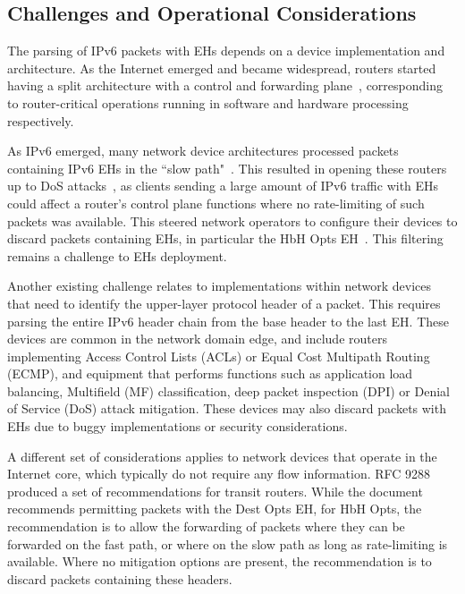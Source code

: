 \documentclass[conference]{IEEEtran}
\begin{document}
\subsection{Challenges and Operational Considerations}

The parsing of IPv6 packets with EHs depends on a device implementation and
architecture. As the Internet emerged and became widespread, routers started having a split architecture with a control and forwarding plane~\cite{RFC3654}, corresponding to router-critical operations running in software and hardware processing respectively.

As IPv6 emerged, many network device architectures processed packets containing IPv6 EHs in the ``slow path"~\cite{ietf-v6ops-hbh-03}.  This resulted in opening these routers up to DoS attacks~\cite{naagas2021deh}, as clients sending a large amount of IPv6 traffic with EHs could affect a router's control plane functions where no rate-limiting of such packets was available. This steered
network operators to configure their devices to discard packets containing EHs,
in particular the HbH Opts EH~\cite{ietf-v6ops-hbh-03}. This filtering remains a challenge to EHs deployment.

Another existing challenge relates to implementations within network devices that need to identify the upper-layer protocol header of a packet. This
requires parsing the entire IPv6 header chain from the base header to
the last EH. These devices are common in the network domain edge,
and include routers implementing Access Control Lists (ACLs) or Equal Cost
Multipath Routing (ECMP), and equipment that performs functions such as
application load balancing, Multifield (MF) classification, deep packet
inspection (DPI) or Denial of Service (DoS) attack mitigation. These devices may also discard packets with EHs due to buggy implementations or security considerations.


A different set of considerations applies to network devices that operate in the Internet core, which typically do not require any flow information.
RFC 9288~\cite{rfc9288} produced a set of recommendations for transit routers. While the document recommends permitting packets with the Dest Opts EH, for HbH Opts, the recommendation is to allow the forwarding of packets where they can be forwarded on the fast path, or where on the slow path as long as rate-limiting is available. Where no mitigation options are present, the recommendation is to discard packets containing these headers. 
\end{document}
